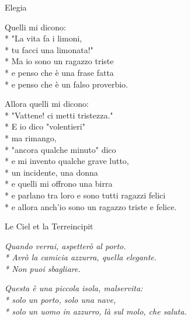 \documentclass[12pt]{book}
\begin{document}
\begin{poem}{Elegia}{}
\begin{changemargin}{-1cm}{-2cm}
\begin{altverse}
Quelli mi dicono:\\*
"La vita fa i limoni,\\*
tu facci una limonata!"\\*
Ma io sono un ragazzo triste\\*
e penso che è una frase fatta\\*
e penso che è un falso proverbio.
\end{altverse}


\begin{altverse}
Allora quelli mi dicono:\\*
"Vattene! ci metti tristezza."\\*
E io dico "volentieri"\\*
ma rimango,\\*
"ancora qualche minuto" dico\\*
e mi invento qualche grave lutto,\\*
un incidente, una donna\\*
e quelli mi offrono una birra\\*
e parlano tra loro e sono tutti ragazzi felici\\*
e allora anch'io sono un ragazzo triste e felice.
\end{altverse}
\end{changemargin}
\end{poem}

\begin{poem}{Le Ciel et la Terre}{incipit}

\settowidth{\versewidth}{non meno è ciò che meriti.}
\begin{changemargin}{-1cm}{-2cm} 
\begin{altverse}
\incipit{}
\textit{\quad \qquad Quando verrai, aspetterò al porto. \\*
Avrò la camicia azzurra, quella elegante. \\*
Non puoi sbagliare.}
\end{altverse}

\begin{altverse}
\textit{Questa è una piccola isola, malservita:\\*
solo un porto, solo una nave, \\*
solo un uomo in azzurro, là sul molo, che saluta.}
\end{altverse}
\end{changemargin}
\end{poem}
\end{document}

